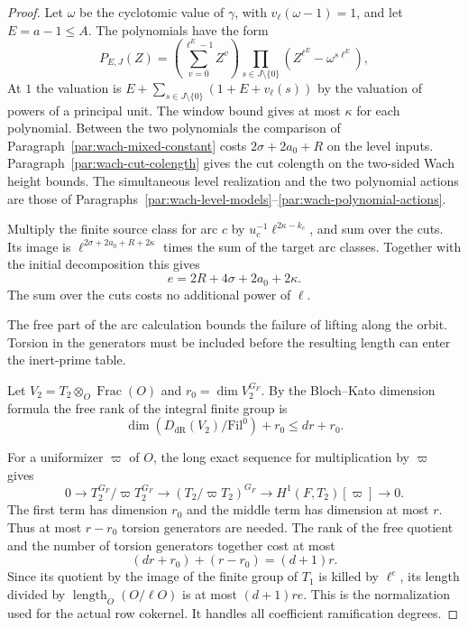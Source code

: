 \begin{proof}
Let \(\omega\) be the cyclotomic value of \(\gamma\), with
\(v_\ell(\omega-1)=1\), and let \(E=a-1\le A\).
The polynomials have the form
\[
 P_{E,J}(Z)=\left(\sum_{v=0}^{\ell^E-1}Z^v\right)
            \prod_{s\in J\setminus\{0\}}
                 (Z^{\ell^E}-\omega^{s\ell^E}),
\]
At \(1\) the valuation is
\(E+\sum_{s\in J\setminus\{0\}}(1+E+v_\ell(s))\)
by the valuation of powers of a principal unit. The window
bound gives at most \(\kappa\) for each polynomial. Between the two
polynomials the comparison of Paragraph~\ref{par:wach-mixed-constant}
costs \(2\sigma+2a_0+R\) on the level inputs.
Paragraph~\ref{par:wach-cut-colength} gives the cut colength
on the two-sided Wach height bounds. The simultaneous level
realization and the two polynomial actions are those of
Paragraphs~\ref{par:wach-level-models}--\ref{par:wach-polynomial-actions}.

Multiply the finite source class for arc \(c\) by
\(u_c^{-1}\ell^{2\kappa-k_c}\), and sum over the cuts. Its image
is \(\ell^{2\sigma+2a_0+R+2\kappa}\) times the sum of the target
arc classes. Together with the initial decomposition this gives
\[
 e=2R+4\sigma+2a_0+2\kappa.
\]
The sum over the cuts costs no
additional power of \(\ell\).

The free part of the arc calculation bounds the failure of lifting along the orbit. Torsion in the generators must be included before the resulting length can enter the inert-prime table.


Let \(V_2=T_2\otimes_O\operatorname{Frac}(O)\) and
\(r_0=\dim V_2^{G_F}\). By the Bloch--Kato dimension formula the
free rank of the integral finite group is
\[
 \dim(D_{\mathrm{dR}}(V_2)/\mathrm{Fil}^0)+r_0\le dr+r_0.
\]

For a uniformizer \(\varpi\) of \(O\), the long exact sequence
for multiplication by \(\varpi\) gives
\[
 0\longrightarrow T_2^{G_F}/\varpi T_2^{G_F}
   \longrightarrow (T_2/\varpi T_2)^{G_F}
   \longrightarrow H^1(F,T_2)[\varpi]\longrightarrow0.
\]
The first term has dimension \(r_0\) and the middle term has
dimension at most \(r\). Thus at most \(r-r_0\) torsion generators
are needed. The rank of the free quotient and the number of torsion generators together cost at most
\[
 (dr+r_0)+(r-r_0)=(d+1)r.
\]
Since its quotient by the image of
the finite group of \(T_1\) is killed by \(\ell^e\), its length
divided by \(\operatorname{length}_O(O/\ell O)\) is at most
\((d+1)re\). This is the normalization used for the actual row
cokernel. It handles all coefficient ramification degrees.


\end{proof}
